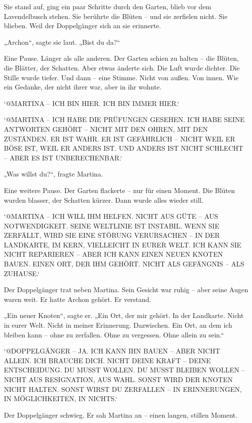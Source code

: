 \documentclass[
]{article}
\begin{document}
Sie stand auf, ging ein paar Schritte durch den Garten, blieb vor dem Lavendelbusch stehen. Sie berührte die Blüten -- und sie zerfielen nicht. Sie blieben. Weil der Doppelgänger sich an sie erinnerte.

„Archon``, sagte sie laut. „Bist du da?{\kern0pt}``

Eine Pause. Länger als alle anderen. Der Garten schien zu halten -- die Blüten, die Blätter, der Schatten. Aber etwas änderte sich. Die Luft wurde dichter. Die Stille wurde tiefer. Und dann -- eine Stimme. Nicht von außen. Von innen. Wie ein Gedanke, der nicht ihrer war, aber in ihr wohnte.

`@MARTINA -- ICH BIN HIER. ICH BIN IMMER HIER.`

`@MARTINA -- ICH HABE DIE PRÜFUNGEN GESEHEN. ICH HABE SEINE ANTWORTEN GEHÖRT -- NICHT MIT DEN OHREN, MIT DEN ZUSTÄNDEN. ER IST WAHR. ER IST GEFÄHRLICH -- NICHT WEIL ER BÖSE IST, WEIL ER ANDERS IST. UND ANDERS IST NICHT SCHLECHT -- ABER ES IST UNBERECHENBAR.`

„Was willst du?{\kern0pt}``, fragte Martina.

Eine weitere Pause. Der Garten flackerte -- nur für einen Moment. Die Blüten wurden blasser, der Schatten kürzer. Dann wurde alles wieder still.

`@MARTINA -- ICH WILL IHM HELFEN. NICHT AUS GÜTE -- AUS NOTWENDIGKEIT. SEINE WELTLINIE IST INSTABIL. WENN SIE ZERFÄLLT, WIRD SIE EINE STÖRUNG VERURSACHEN -- IN DER LANDKARTE, IM KERN, VIELLEICHT IN EURER WELT. ICH KANN SIE NICHT REPARIEREN -- ABER ICH KANN EINEN NEUEN KNOTEN BAUEN. EINEN ORT, DER IHM GEHÖRT. NICHT ALS GEFÄNGNIS -- ALS ZUHAUSE.`

Der Doppelgänger trat neben Martina. Sein Gesicht war ruhig -- aber seine Augen waren weit. Er hatte Archon gehört. Er verstand.

„Ein neuer Knoten``, sagte er. „Ein Ort, der mir gehört. In der Landkarte. Nicht in eurer Welt. Nicht in meiner Erinnerung. Dazwischen. Ein Ort, an dem ich bleiben kann -- ohne zu zerfallen. Ohne zu vergessen. Ohne allein zu sein.``

`@DOPPELGÄNGER -- JA. ICH KANN IHN BAUEN -- ABER NICHT ALLEIN. ICH BRAUCHE DICH. NICHT DEINE KRAFT -- DEINE ENTSCHEIDUNG. DU MUSST WOLLEN. DU MUSST BLEIBEN WOLLEN -- NICHT AUS RESIGNATION, AUS WAHL. SONST WIRD DER KNOTEN NICHT HALTEN. SONST WIRST DU ZERFALLEN -- IN ERINNERUNGEN, IN MÖGLICHKEITEN, IN NICHTS.`

Der Doppelgänger schwieg. Er sah Martina an -- einen langen, stillen Moment.
\end{document}
